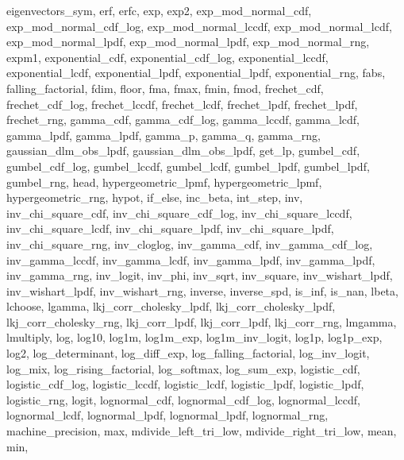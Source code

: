 {{    eigenvectors_sym,%
    erf,%
    erfc,%
    exp,%
    exp2,%
    exp_mod_normal_cdf,%
    exp_mod_normal_cdf_log,%
    exp_mod_normal_lccdf,%
    exp_mod_normal_lcdf,%
    exp_mod_normal_lpdf,%
    exp_mod_normal_lpdf,%
    exp_mod_normal_rng,%
    expm1,%
    exponential_cdf,%
    exponential_cdf_log,%
    exponential_lccdf,%
    exponential_lcdf,%
    exponential_lpdf,%
    exponential_lpdf,%
    exponential_rng,%
    fabs,%
    falling_factorial,%
    fdim,%
    floor,%
    fma,%
    fmax,%
    fmin,%
    fmod,%
    frechet_cdf,%
    frechet_cdf_log,%
    frechet_lccdf,%
    frechet_lcdf,%
    frechet_lpdf,%
    frechet_lpdf,%
    frechet_rng,%
    gamma_cdf,%
    gamma_cdf_log,%
    gamma_lccdf,%
    gamma_lcdf,%
    gamma_lpdf,%
    gamma_lpdf,%
    gamma_p,%
    gamma_q,%
    gamma_rng,%
    gaussian_dlm_obs_lpdf,%
    gaussian_dlm_obs_lpdf,%
    get_lp,%
    gumbel_cdf,%
    gumbel_cdf_log,%
    gumbel_lccdf,%
    gumbel_lcdf,%
    gumbel_lpdf,%
    gumbel_lpdf,%
    gumbel_rng,%
    head,%
    hypergeometric_lpmf,%
    hypergeometric_lpmf,%
    hypergeometric_rng,%
    hypot,%
    if_else,%
    inc_beta,%
    int_step,%
    inv,%
    inv_chi_square_cdf,%
    inv_chi_square_cdf_log,%
    inv_chi_square_lccdf,%
    inv_chi_square_lcdf,%
    inv_chi_square_lpdf,%
    inv_chi_square_lpdf,%
    inv_chi_square_rng,%
    inv_cloglog,%
    inv_gamma_cdf,%
    inv_gamma_cdf_log,%
    inv_gamma_lccdf,%
    inv_gamma_lcdf,%
    inv_gamma_lpdf,%
    inv_gamma_lpdf,%
    inv_gamma_rng,%
    inv_logit,%
    inv_phi,%
    inv_sqrt,%
    inv_square,%
    inv_wishart_lpdf,%
    inv_wishart_lpdf,%
    inv_wishart_rng,%
    inverse,%
    inverse_spd,%
    is_inf,%
    is_nan,%
    lbeta,%
    lchoose,%
    lgamma,%
    lkj_corr_cholesky_lpdf,%
    lkj_corr_cholesky_lpdf,%
    lkj_corr_cholesky_rng,%
    lkj_corr_lpdf,%
    lkj_corr_lpdf,%
    lkj_corr_rng,%
    lmgamma,%
    lmultiply,%
    log,%
    log10,%
    log1m,%
    log1m_exp,%
    log1m_inv_logit,%
    log1p,%
    log1p_exp,%
    log2,%
    log_determinant,%
    log_diff_exp,%
    log_falling_factorial,%
    log_inv_logit,%
    log_mix,%
    log_rising_factorial,%
    log_softmax,%
    log_sum_exp,%
    logistic_cdf,%
    logistic_cdf_log,%
    logistic_lccdf,%
    logistic_lcdf,%
    logistic_lpdf,%
    logistic_lpdf,%
    logistic_rng,%
    logit,%
    lognormal_cdf,%
    lognormal_cdf_log,%
    lognormal_lccdf,%
    lognormal_lcdf,%
    lognormal_lpdf,%
    lognormal_lpdf,%
    lognormal_rng,%
    machine_precision,%
    max,%
    mdivide_left_tri_low,%
    mdivide_right_tri_low,%
    mean,%
    min,%
}}
